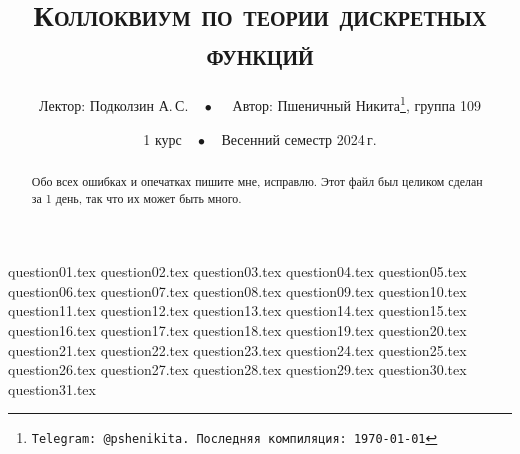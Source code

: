 \documentclass[a4paper, 11pt]{article}
\begin{document}
\title{\bfseries\scshape Коллоквиум по теории дискретных функций}
\date{1 курс$\quad\bullet\quad$Весенний семестр 2024\,г.}
\author{Лектор: Подколзин А.\,С.$\quad\bullet\quad$ Автор: Пшеничный Никита\thanks{\texttt{Telegram: @pshenikita. Последняя компиляция: \today}}, группа 109}

\maketitle

\begin{abstract}
    Обо всех ошибках и опечатках пишите мне, исправлю. Этот файл был целиком сделан за 1 день, так что их может быть много.
\end{abstract}

\tableofcontents

\newpage

{question01.tex}
{question02.tex}
{question03.tex}
{question04.tex}
{question05.tex}
{question06.tex}
{question07.tex}
{question08.tex}
{question09.tex}
{question10.tex}
{question11.tex}
{question12.tex}
{question13.tex}
{question14.tex}
{question15.tex}
{question16.tex}
{question17.tex}
{question18.tex}
{question19.tex}
{question20.tex}
{question21.tex}
{question22.tex}
{question23.tex}
{question24.tex}
{question25.tex}
{question26.tex}
{question27.tex}
{question28.tex}
{question29.tex}
{question30.tex}
{question31.tex}
\end{document}
